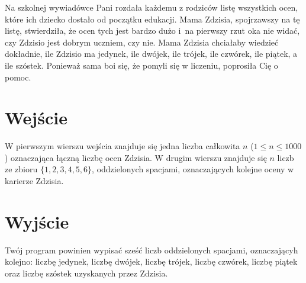 \documentclass{spiral-kurs}
\begin{document}
\makeheader
%
  Na szkolnej wywiadówce Pani rozdała każdemu z rodziców listę wszystkich ocen, które ich dziecko dostało od początku edukacji.
  Mama Zdzisia, spojrzawszy na tę listę, stwierdziła, że ocen tych jest bardzo dużo i~na pierwszy rzut oka nie widać,
  czy Zdzisio jest dobrym uczniem, czy nie.
  Mama Zdzisia chciałaby wiedzieć dokładnie, ile Zdzisio ma jedynek, ile dwójek, ile trójek, ile czwórek, ile piątek, a ile szóstek.
  Ponieważ sama boi się, że pomyli się w liczeniu, poprosiła Cię o pomoc.
    
  \section{Wejście}
  W pierwszym wierszu wejścia znajduje się jedna liczba całkowita $n$ ($1 \le n \le 1000$) oznaczająca łączną liczbę ocen Zdzisia.
  W drugim wierszu znajduje się $n$ liczb ze zbioru $\{1,2,3,4,5,6\}$, oddzielonych spacjami,
  oznaczających kolejne oceny w karierze Zdzisia.
    
  \section{Wyjście}
  Twój program powinien wypisać sześć liczb oddzielonych spacjami, oznaczającyh kolejno:
  liczbę jedynek, liczbę dwójek, liczbę trójek, liczbę czwórek, liczbę piątek oraz liczbę szóstek uzyskanych przez Zdzisia.



  
\end{document}
